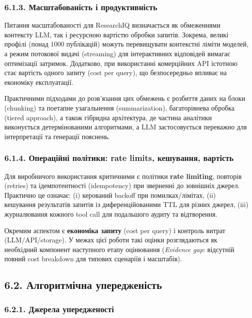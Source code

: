 \subsubsection*{6.1.3. Масштабованість і продуктивність}

Питання масштабованості для ResearchIQ визначається як обмеженнями контексту LLM, так і ресурсною вартістю обробки запитів. Зокрема, великі профілі (понад 1000 публікацій) можуть перевищувати контекстні ліміти моделей, а режим потокової видачі (streaming) для інтерактивних відповідей вимагає оптимізації затримок. Додатково, при використанні комерційних API істотною стає вартість одного запиту (cost per query), що безпосередньо впливає на економіку експлуатації.

Практичними підходами до розв'язання цих обмежень є розбиття даних на блоки (chunking) та поетапне узагальнення (summarization), багаторівнева обробка (tiered approach), а також гібридна архітектура, де частина аналітики виконується детермінованими алгоритмами, а LLM застосовується переважно для інтерпретації та генерації пояснень.

\subsubsection*{6.1.4. Операційні політики: rate limits, кешування, вартість}

Для виробничого використання критичними є політики \textbf{rate limiting}, повторів (retries) та ідемпотентності (idempotency) при зверненні до зовнішніх джерел. Практично це означає: (i) керований backoff при помилках/лімітах, (ii) кешування результатів запитів із диференційованими TTL для різних джерел, (iii) журналювання кожного tool call для подальшого аудиту та відтворення.

Окремим аспектом є \textbf{економіка запиту} (cost per query) і контроль витрат (LLM/API/storage). У межах цієї роботи такі оцінки розглядаються як необхідний компонент наступного етапу оцінювання (\textit{Evidence gap}: відсутній повний cost breakdown для типових сценаріїв і масштабів).

\subsection*{6.2. Алгоритмічна упередженість}

\subsubsection*{6.2.1. Джерела упередженості}

